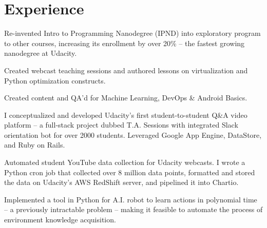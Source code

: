 \documentclass[]{deedy-resume-openfont}
\begin{document}
\begin{minipage}[t]{0.66\textwidth} 


\section{Experience}

\vspace{\topsep} %
\begin{tightemize}

\item Re-invented Intro to Programming Nanodegree (IPND) into exploratory program to other courses, increasing its enrollment by over 20\% -- the fastest growing nanodegree at Udacity.

\item Created webcast teaching sessions and authored lessons on virtualization and Python optimization constructs.

\item Created content and QA'd for Machine Learning, DevOps \& Android Basics.
\end{tightemize}

\vspace{\topsep} %

\location{}
\begin{tightemize}

\item I conceptualized and developed Udacity's first student-to-student Q\&A video platform -- a full-stack project dubbed T.A. Sessions with integrated Slack orientation bot for over 2000 students. Leveraged Google App Engine, DataStore, and Ruby on Rails.

\item Automated student YouTube data collection for Udacity webcasts. I wrote a Python cron job that collected over 8 million data points, formatted and stored the data on Udacity's AWS RedShift server, and pipelined it into Chartio.

\end{tightemize}
\sectionsep

\begin{tightemize}
\item Implemented a tool in Python for A.I. robot to learn actions in polynomial time -- a previously intractable problem -- making it feasible to automate the process of environment knowledge acquisition.


\end{tightemize}
\end{minipage}
\end{document}
